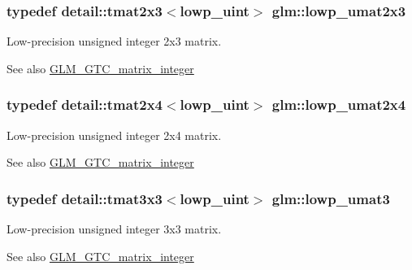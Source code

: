 \subsubsection[{lowp\+\_\+umat2x3}]{\setlength{\rightskip}{0pt plus 5cm}typedef detail\+::tmat2x3$<$lowp\+\_\+uint$>$ {\bf glm\+::lowp\+\_\+umat2x3}}\label{group__gtc__matrix__integer_gacce75aac1f0f0ae3cc18f4cde5db8def}
Low-\/precision unsigned integer 2x3 matrix. \begin{DoxySeeAlso}{See also}
\hyperlink{group__gtc__matrix__integer}{G\+L\+M\+\_\+\+G\+T\+C\+\_\+matrix\+\_\+integer} 
\end{DoxySeeAlso}
\hypertarget{group__gtc__matrix__integer_gaf468ff72b7f833789887c61b8db33869}{}
\subsubsection[{lowp\+\_\+umat2x4}]{\setlength{\rightskip}{0pt plus 5cm}typedef detail\+::tmat2x4$<$lowp\+\_\+uint$>$ {\bf glm\+::lowp\+\_\+umat2x4}}\label{group__gtc__matrix__integer_gaf468ff72b7f833789887c61b8db33869}
Low-\/precision unsigned integer 2x4 matrix. \begin{DoxySeeAlso}{See also}
\hyperlink{group__gtc__matrix__integer}{G\+L\+M\+\_\+\+G\+T\+C\+\_\+matrix\+\_\+integer} 
\end{DoxySeeAlso}
\hypertarget{group__gtc__matrix__integer_ga9a4fea23f614c09bd4f69300849e53b8}{}
\subsubsection[{lowp\+\_\+umat3}]{\setlength{\rightskip}{0pt plus 5cm}typedef detail\+::tmat3x3$<$lowp\+\_\+uint$>$ {\bf glm\+::lowp\+\_\+umat3}}\label{group__gtc__matrix__integer_ga9a4fea23f614c09bd4f69300849e53b8}
Low-\/precision unsigned integer 3x3 matrix. \begin{DoxySeeAlso}{See also}
\hyperlink{group__gtc__matrix__integer}{G\+L\+M\+\_\+\+G\+T\+C\+\_\+matrix\+\_\+integer} 
\end{DoxySeeAlso}
\hypertarget{group__gtc__matrix__integer_gab06e14a13476419d7e8c2421fc7f60a1}{}
